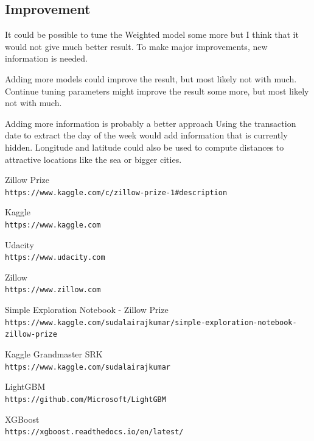 \documentclass[a4paper]{article}
\begin{document}
\subsection{Improvement}
It could be possible to tune the Weighted model some more but I think that it would not give much better result. To make major improvements, new information is needed.

Adding more models could improve the result, but most likely not with much. Continue tuning parameters might improve the result some more, but most likely not with much.

Adding more information is probably a better approach Using the transaction date to extract the day of the week would add information that is currently hidden. Longitude and latitude could also be used to compute distances to attractive locations like the sea or bigger cities. 


\begin{thebibliography}{9}		

Zillow Prize
\\\texttt{https://www.kaggle.com/c/zillow-prize-1\#description}

Kaggle
\\\texttt{https://www.kaggle.com}

Udacity
\\\texttt{https://www.udacity.com}

Zillow
\\\texttt{https://www.zillow.com}

Simple Exploration Notebook - Zillow Prize
\\\texttt{https://www.kaggle.com/sudalairajkumar/simple-exploration-notebook-zillow-prize}

Kaggle Grandmaster SRK
\\\texttt{https://www.kaggle.com/sudalairajkumar}

LightGBM
\\\texttt{https://github.com/Microsoft/LightGBM}		

XGBoost
\\\texttt{https://xgboost.readthedocs.io/en/latest/}

\end{thebibliography}
\end{document}
